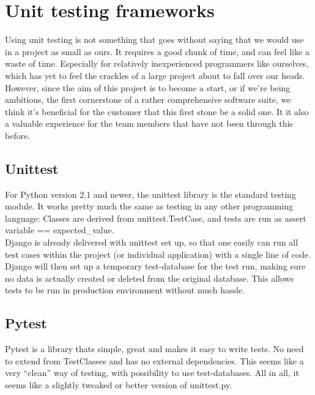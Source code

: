 \documentclass{report}
\begin{document}
\newpage
\section{Unit testing frameworks}
Using unit testing is not something that goes without saying that we would use in a project as small as ours. It requires a good chunk of time, and can feel like a waste of time. Especially for relatively inexperienced programmers like ourselves, which has yet to feel the crackles of a large project about to fall over our heads. However, since the aim of this project is to become a start, or if we’re being ambitious, the first cornerstone of a rather comprehensive software suite, we think it’s beneficial for the customer that this first stone be a solid one. It it also a valuable experience for the team members that have not been through this before.

\subsection{Unittest}
For Python version 2.1 and newer, the unittest library is the standard testing module\cite{webcite:unittest}. It works pretty much the same as testing in any other programming language: Classes are derived from unittest.TestCase, and tests are run as assert variable == expected\_value. \\

Django is already delivered with unittest set up, so that one easily can run all test cases within the project (or individual application) with a single line of code. Django will then set up a temporary test-database for the test run, making sure no data is actually created or deleted from the original database. This allows tests to be run in production environment without much hassle.

\subsection{Pytest}
Pytest\cite{website:pytest} is a library thats simple, great and makes it easy to write tests. No need to extend from TestClasses and has no external dependencies. This seems like a very “clean” way of testing, with possibility to use test-databases. All in all, it seems like a slightly tweaked or better version of unittest.py.
\end{document}
